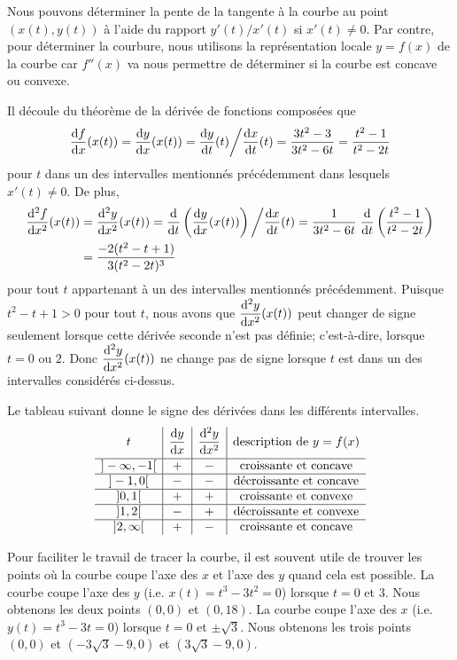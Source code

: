 {\begin{egg}[\theory]
Nous pouvons déterminer la pente de la tangente à la courbe au point
$(x(t),y(t))$ à l'aide du rapport $y'(t)/x'(t)$ si $x'(t) \neq 0$.
Par contre, pour déterminer la courbure, nous utilisons la
représentation locale $y=f(x)$ de la courbe car $f''(x)$ va nous
permettre de déterminer si la courbe est concave ou convexe.

Il découle du théorème de la dérivée de fonctions composées que
\[
\dydx{f}{x}(x(t)) = \dydx{y}{x}(x(t)) = \dydx{y}{t}(t) \bigg/ \dydx{x}{t}(t)
= \frac{3t^2-3}{3t^2-6t} = \frac{t^2-1}{t^2-2t}
\]
pour $t$ dans un des intervalles mentionnés précédemment dans lesquels
$x'(t)\neq 0$.  De plus,
\begin{align*}
\dydxn{f}{x}{2}(x(t)) &= \dydxn{y}{x}{2}(x(t)) =
\dfdx{\left( \dydx{y}{x}(x(t)) \right)}{t}\bigg/\dydx{x}{t}(t)
= \frac{1}{3t^2-6t}\;
\dfdx{\left( \frac{t^2-1}{t^2-2t} \right)}{t} \\
&= \frac{-2(t^2-t+1)}{3(t^2-2t)^3}
\end{align*}
pour tout $t$ appartenant à un des intervalles mentionnés
précédemment.  Puisque $t^2-t+1 >0$ pour tout $t$, nous avons que
$\displaystyle \dydxn{y}{x}{2}(x(t))$ peut changer de signe seulement
lorsque cette dérivée seconde n'est pas définie; c'est-à-dire, lorsque
$t=0$ ou $2$.  Donc $\displaystyle \dydxn{y}{x}{2}(x(t))$ ne change
pas de signe lorsque $t$ est dans un des intervalles considérés ci-dessus.

Le tableau suivant donne le signe des dérivées dans les
différents intervalles.
\[
\begin{array}{c|c|c|c}
t & \displaystyle \dydx{y}{x} & \displaystyle \dydxn{y}{x}{2} &
\text{description de } y=f(x) \\[0.7em]
\hline
]-\infty,-1[ & + & - & \text{croissante et concave} \\
\hline
]-1,0[ & - & - & \text{décroissante et concave} \\
\hline
]0,1[ & + & + & \text{croissante et convexe} \\
\hline
]1,2[ & - & + & \text{décroissante et convexe} \\
\hline
]2,\infty[ & + & - & \text{croissante et concave}
\end{array}
\]

Pour faciliter le travail de tracer la courbe, il est souvent utile de
trouver les points où la courbe coupe l'axe des $x$ et l'axe des $y$
quand cela est possible.  La courbe coupe l'axe des $y$
(i.e. $x(t)=t^3-3t^2=0$) lorsque $t=0$ et $3$.  Nous obtenons les deux
points $(0,0)$ et $(0,18)$.  La courbe coupe l'axe des $x$
(i.e. $y(t)=t^3-3t=0$) lorsque $t=0$ et $\pm \sqrt{3}$.  Nous obtenons
les trois points $(0,0)$ et $(-3\sqrt{3}-9,0)$ et $(3\sqrt{3} -9,0)$.


\end{egg}}

